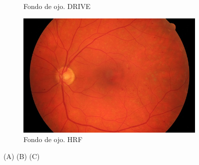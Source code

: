 \begin{figure}[H]
\begin{subfigure}[b]{0.3\textwidth}
        \caption{Fondo de ojo. DRIVE}
        \label{fig:Drive}
    \end{subfigure}
    \begin{subfigure}[b]{0.3\textwidth}
				\centering
        \includegraphics[height=\textwidth]{./Figures/imagesHRF.png}
        \caption{Fondo de ojo. HRF}
        \label{fig:Hrf}
    \end{subfigure}        
    \label{fig:Imagenes de fondo de ojo}
    \caption{(A) (B) (C)}
\end{figure}


